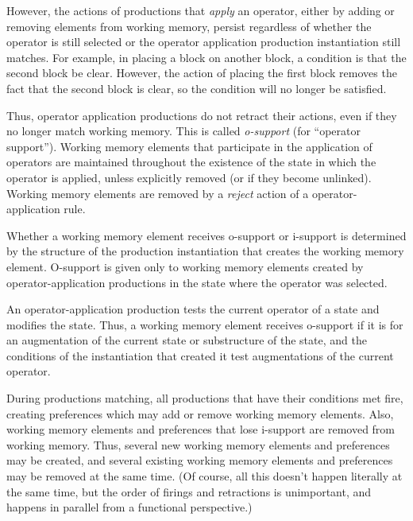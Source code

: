 However, the actions of productions that \emph{apply} an operator, either by adding or removing elements from working memory, persist regardless of whether the operator is still selected or the operator application  production instantiation still matches. For example, in placing a block on another block, a condition is that the second block be clear. However, the action of placing the first block removes the fact that the second block is clear, so the condition will no longer be satisfied.

Thus, operator application productions do not retract their actions, even if they no longer match working memory.  This is called \emph{o-support}  (for ``operator support''). Working memory elements that participate in the application of operators are maintained throughout the existence of the state in which the operator is applied, unless explicitly removed (or if they become unlinked).  Working memory elements are removed by a \emph{reject} action of a operator-application rule.

Whether a working memory element receives o-support or i-support is determined by the structure of the production instantiation that creates the working memory element.  O-support is given only to working memory elements created by operator-application productions in the state where the operator was selected.

An operator-application production tests the current operator of a state and modifies the state. Thus, a working memory element receives o-support if it is for an augmentation of the current state or substructure of the state, and the conditions of the instantiation that created it test augmentations of the current operator.

During productions matching, all productions that have their conditions met fire, creating preferences which may add or remove working memory elements.  Also, working memory elements and preferences that lose i-support are removed from working memory. Thus, several new working memory elements and preferences may be created, and several existing working memory elements and preferences may be removed at the same time. (Of course, all this doesn’t happen literally at the same time, but the order of firings and retractions is unimportant, and happens in parallel from a functional perspective.)

